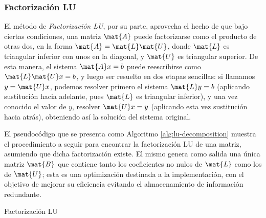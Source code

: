         \subsubsection{Factorización LU}

            El método de \emph{Factorización LU}, por su parte, aprovecha el hecho de que bajo ciertas condiciones, una matriz $\mat{A}$ puede factorizarse como el producto de otras dos, en la forma $\mat{A} = \mat{L}\mat{U}$, donde $\mat{L}$ es triangular inferior con unos en la diagonal, y $\mat{U}$ es triangular superior. De esta manera, el sistema $\mat{A}x=b$ puede reescribirse como $\mat{L}\mat{U}x=b$, y luego ser resuelto en dos etapas sencillas: si llamamos $y=\mat{U}x$, podemos resolver primero el sistema $\mat{L}y=b$ (aplicando sustitución hacia adelante, pues $\mat{L}$ es triangular inferior), y una vez conocido el valor de $y$, resolver $\mat{U}x=y$ (aplicando esta vez sustitución hacia atrás), obteniendo así la solución del sistema original.

            El pseudocódigo que se presenta como Algoritmo \ref{alg:lu-decomposition} muestra el procedimiento a seguir para encontrar la factorización LU de una matriz, asumiendo que dicha factorización existe. El mismo genera como salida una única matriz $\mat{B}$ que contiene tanto los coeficientes no nulos de $\mat{L}$ como los de $\mat{U}$; esta es una optimización destinada a la implementación, con el objetivo de mejorar su eficiencia evitando el almacenamiento de información redundante.

            \vspace{.5em}
            \begin{algorithm}[H]
                \caption{Factorización LU} \label{alg:lu-decomposition}
            \end{algorithm}
            \vspace{.5em}

